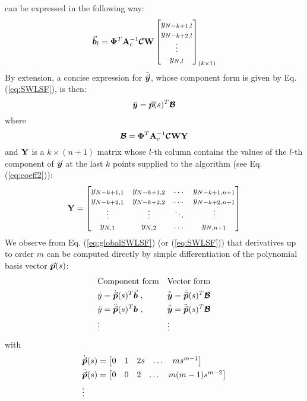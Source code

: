 can be expressed in the 
following way:
\begin{equation}
	\vec{\bm{b}}_l = 
	\mathbf{\Phi}^T\mathbf{A}_c^{-1}\bm{\mathcal{C}}\mathbf{W}\begin{bmatrix}
		y_{N-k+1,l} \\ y_{N-k+2,l}\\ \vdots \\ y_{N,l}
	\end{bmatrix}_{(k\times 1)}
	\label{eq:coeff2}
\end{equation}
By extension, a concise expression for $\bar{\vec{\bm{y}}}$, whose component form 
is given by Eq. (\ref{eq:SWLSF}), is then:
\begin{equation}
	\bar{\bm{y}}=\vec{\bm{p}}(s)^T\bm{\mathcal{B}}
	\label{eq:globalSWLSF}
\end{equation}
where
\begin{equation}
	\bm{\mathcal{B}}=\mathbf{\Phi}^T\mathbf{A}_c^{-1}\bm{\mathcal{C}}\mathbf{W}\mathbf{Y}
	\label{eq:B}
\end{equation}
and $\mathbf{Y}$ is a $k\times(n+1)$ matrix whose $l$-th column contains
the values of the $l$-th component of $\vec{\bm{y}}$ at the last $k$ points
supplied to the algorithm (see Eq. (\ref{eq:coeff2})):
\begin{equation}
	\mathbf{Y}=\begin{bmatrix}
		y_{N-k+1,1} & y_{N-k+1,2} & \dots & y_{N-k+1,n+1}\\
		y_{N-k+2,1} & y_{N-k+2,2} & \dots & y_{N-k+2,n+1}\\
		\vdots      & \vdots      & \ddots & \vdots\\
		y_{N,1} & y_{N,2} & \dots & y_{N,n+1}\\
	\end{bmatrix}
	\label{eq:Y}
\end{equation}
We observe from Eq. (\ref{eq:globalSWLSF}) (or (\ref{eq:SWLSF})) that 
derivatives up 
to order $m$ can be computed directly by simple differentiation of the 
polynomial basis vector $\vec{\bm{p}}(s)$:
\begin{align}
	& \text{Component form} && \text{Vector form}\nonumber\\
	&\dot{y} = \dot{\vec{\bm{p}}}(s)^T\vec{\bm{b}}\ , &&
	\dot{\bar{\bm{y}}}= \dot{\vec{\bm{p}}}(s)^T\bm{\mathcal{B}}\nonumber\\
	&\ddot{y} = \ddot{\vec{\bm{p}}}(s)^T\bm{b}\ , &&
	\ddot{\bar{\bm{y}}}= \ddot{\vec{\bm{p}}}(s)^T\bm{\mathcal{B}}\nonumber\\
	&\vdots && \vdots\nonumber
\end{align}
with 
\begin{align*}
	&\dot{\vec{\bm{p}}}(s)=\begin{bmatrix}
		0 & 1 & 2s & \dots & ms^{m-1}
	\end{bmatrix}\\
	&\ddot{\vec{\bm{p}}}(s)=\begin{bmatrix}
		0 & 0 & 2 & \dots & m(m-1)s^{m-2}
	\end{bmatrix}\\
	&\vdots
\end{align*}


